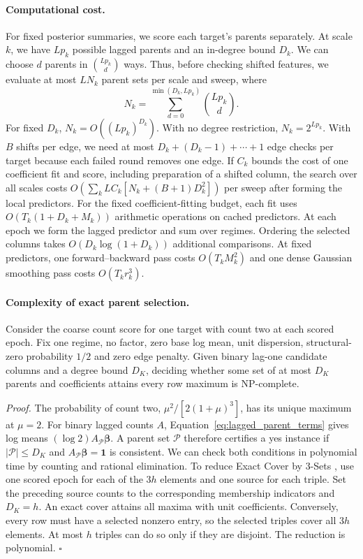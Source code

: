 \documentclass[sigconf]{acmart}
\begin{document}
\paragraph{Computational cost.} For fixed posterior summaries, we score each target's parents separately. At scale \(k\), we have \(L p_k\) possible lagged parents and an in-degree bound \(D_k\). We can choose \(d\) parents in \(\binom{Lp_k}{d}\) ways. Thus, before checking shifted features, we evaluate at most \(L N_k\) parent sets per scale and sweep, where
\[
 N_k=\sum_{d=0}^{\min(D_k,Lp_k)}\binom{Lp_k}{d}.
\]
For fixed \(D_k\), \(N_k=O((Lp_k)^{D_k})\). With no degree restriction, \(N_k=2^{Lp_k}\). With \(B\) shifts per edge, we need at most \(D_k+(D_k-1)+\cdots+1\) edge checks per target because each failed round removes one edge. If \(C_k\) bounds the cost of one coefficient fit and score, including preparation of a shifted column, the search over all scales costs \(O(\sum_k L C_k[N_k+(B+1)D_k^2])\) per sweep after forming the local predictors. For the fixed coefficient-fitting budget, each fit uses \(O(T_k(1+D_k+M_k))\) arithmetic operations on cached predictors. At each epoch we form the lagged predictor and sum over regimes. Ordering the selected columns takes \(O(D_k\log(1+D_k))\) additional comparisons. At fixed predictors, one forward--backward pass costs \(O(T_k M_k^2)\) and one dense Gaussian smoothing pass costs \(O(T_k r_k^3)\).

\paragraph{Complexity of exact parent selection.} Consider the coarse count score for one target with count two at each scored epoch. Fix one regime, no factor, zero base log mean, unit dispersion, structural-zero probability \(1/2\) and zero edge penalty. Given binary lag-one candidate columns and a degree bound \(D_K\), deciding whether some set of at most \(D_K\) parents and coefficients attains every row maximum is NP-complete.

\emph{Proof.} The probability of count two, \(\mu^2/[2(1+\mu)^3]\), has its unique maximum at \(\mu=2\). For binary lagged counts \(A\), Equation~\eqref{eq:lagged_parent_terms} gives log means \((\log 2)A_{\mathcal P}\boldsymbol\beta\). A parent set \(\mathcal P\) therefore certifies a yes instance if \(|\mathcal P|\le D_K\) and \(A_{\mathcal P}\boldsymbol\beta=\mathbf 1\) is consistent. We can check both conditions in polynomial time by counting and rational elimination. To reduce Exact Cover by 3-Sets \citep{gonzalez_exact_cover_1985}, use one scored epoch for each of the \(3h\) elements and one source for each triple. Set the preceding source counts to the corresponding membership indicators and \(D_K=h\). An exact cover attains all maxima with unit coefficients. Conversely, every row must have a selected nonzero entry, so the selected triples cover all \(3h\) elements. At most \(h\) triples can do so only if they are disjoint. The reduction is polynomial. \(\square\)
\end{document}
